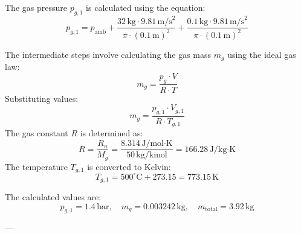 The gas pressure \( p_{g,1} \) is calculated using the equation:  
\[
p_{g,1} = p_{\text{amb}} + \frac{32 \, \text{kg} \cdot 9.81 \, \text{m/s}^2}{\pi \cdot (0.1 \, \text{m})^2} + \frac{0.1 \, \text{kg} \cdot 9.81 \, \text{m/s}^2}{\pi \cdot (0.1 \, \text{m})^2}
\]  

The intermediate steps involve calculating the gas mass \( m_g \) using the ideal gas law:  
\[
m_g = \frac{p_g \cdot V}{R \cdot T}
\]  
Substituting values:  
\[
m_g = \frac{p_{g,1} \cdot V_{g,1}}{R \cdot T_{g,1}}
\]  
The gas constant \( R \) is determined as:  
\[
R = \frac{R_u}{M_g} = \frac{8.314 \, \text{J/mol·K}}{50 \, \text{kg/kmol}} = 166.28 \, \text{J/kg·K}
\]  
The temperature \( T_{g,1} \) is converted to Kelvin:  
\[
T_{g,1} = 500^\circ\text{C} + 273.15 = 773.15 \, \text{K}
\]  

The calculated values are:  
\[
p_{g,1} = 1.4 \, \text{bar}, \quad m_g = 0.003242 \, \text{kg}, \quad m_{\text{total}} = 3.92 \, \text{kg}
\]  

---